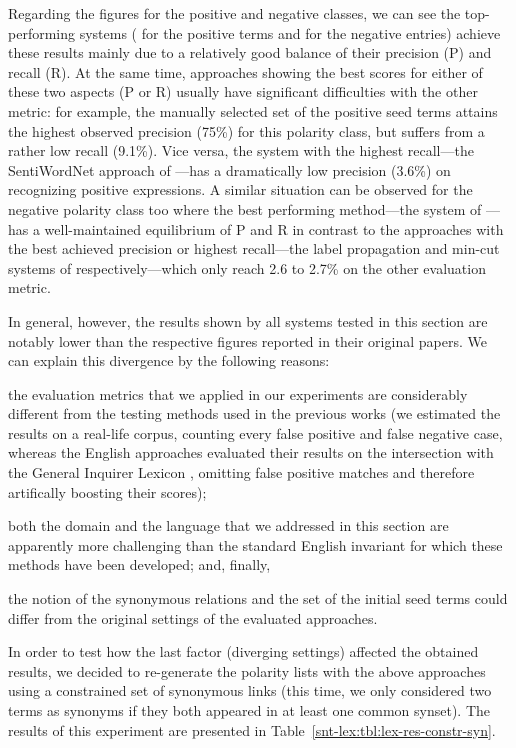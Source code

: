 Regarding the figures for the positive and negative classes, we can
see the top-performing systems (\citet{Blair-Goldensohn:08} for the
positive terms and \citet{Hu:04} for the negative entries) achieve
these results mainly due to a relatively good balance of their
precision (P) and recall (R).  At the same time, approaches showing
the best scores for either of these two aspects (P or R) usually have
significant difficulties with the other metric: for example, the
manually selected set of the positive seed terms attains the highest
observed precision (75\%) for this polarity class, but suffers from a
rather low recall (9.1\%).  Vice versa, the system with the highest
recall---the SentiWordNet approach of \citet{Esuli:06c}---has a
dramatically low precision (3.6\%) on recognizing positive
expressions.  A similar situation can be observed for the negative
polarity class too where the best performing method---the system of
\citet{Hu:04}---has a well-maintained equilibrium of P and R in
contrast to the approaches with the best achieved precision or highest
recall---the label propagation and min-cut systems of \citet{Rao:09}
respectively---which only reach 2.6 to 2.7\% on the other evaluation
metric.

In general, however, the results shown by all systems tested in this
section are notably lower than the respective figures reported in
their original papers.  We can explain this divergence by the
following reasons:
\begin{inparaenum}
\item the evaluation metrics that we applied in our experiments are
  considerably different from the testing methods used in the previous
  works (we estimated the results on a real-life corpus, counting
  every false positive and false negative case, whereas the English
  approaches evaluated their results on the intersection with the
  General Inquirer Lexicon \cite{Stone:66}, omitting false positive
  matches and therefore artifically boosting their scores);
\item both the domain and the language that we addressed in this
  section are apparently more challenging than the standard English
  invariant for which these methods have been developed; and, finally,
\item the notion of the synonymous relations and the set of the
  initial seed terms could differ from the original settings of the
  evaluated approaches.
\end{inparaenum}

In order to test how the last factor (diverging settings) affected the
obtained results, we decided to re-generate the polarity lists with
the above approaches using a constrained set of synonymous links (this
time, we only considered two terms as synonyms if they both appeared
in at least one common synset).  The results of this experiment are
presented in Table~\ref{snt-lex:tbl:lex-res-constr-syn}.

